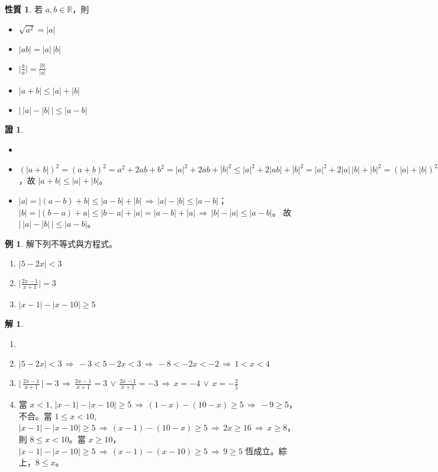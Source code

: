 \documentclass[12pt]{extarticle}
\newcommand{\ds}{\displaystyle}
\newcommand{\ie}{\,\Longrightarrow\,}
\theoremstyle{definition}
\newtheorem*{prp}{性質}
\newtheorem*{ex}{例}
\newtheorem*{sol}{解}
\newtheorem*{prf}{證}
\begin{document}
\begin{prp}
  若 $a, b\in\mathbb{R}$，則
  \begin{itemize}\setlength\itemsep{0em}
    \item $\ds \sqrt{a^2} = |a|$
    \item $\ds |a b| = |a|\,|b|$
    \item $\ds \Big|\frac{b}{a}\Big| = \frac{|b|}{|a|}$
    \item $\ds |a + b|\leqslant|a| + |b|$
    \item $\ds \big|\,|a| - |b|\,\big|\leqslant|a - b|$
  \end{itemize}
\end{prp}

\begin{prf}
  \begin{itemize}\setlength\itemsep{0em}
    \item[]
    \item $\ds (|a + b|)^2 = (a + b)^2 = a^2 + 2 a b + b^2 = |a|^2 + 2 a b + |b|^2 \leqslant |a|^2 + 2 |a b| + |b|^2 = |a|^2 + 2 |a|\,|b| + |b|^2 = (|a| + |b|)^2$，故 $\ds |a + b|\leqslant|a| + |b|$。
    \item $\ds |a| = |(a - b) + b| \leqslant |a - b| + |b| \ie |a| - |b| \leqslant |a - b|$； $\ds |b| = |(b - a) + a| \leqslant |b - a| + |a| = |a - b| + |a| \ie |b| - |a| \leqslant |a - b|$。 故 $\ds \big|\,|a| - |b|\,\big|\leqslant|a - b|$。
  \end{itemize}
\end{prf}

\begin{ex}
  解下列不等式與方程式。
  \begin{enumerate}\setlength\itemsep{0em}
    \item $\ds |5 - 2x| < 3$
    \item $\ds \Big|\frac{2 x - 1}{x + 1}\Big| = 3$
    \item $\ds |x - 1| - |x - 10|\geqslant 5$
  \end{enumerate}
\end{ex}

\begin{sol}
  \begin{enumerate}\setlength\itemsep{0em}
    \item[]
    \item $\ds |5 - 2x| < 3 \ie -3 < 5 - 2x < 3 \ie -8 < -2x < -2 \ie 1 < x < 4$
    \item $\ds \Big|\,\frac{2 x - 1}{x + 1}\,\Big| = 3 \ie \frac{2 x - 1}{x + 1} = 3\,\vee\,\frac{2 x - 1}{x + 1} = -3 \ie x = -4 \,\vee\, x = -\frac{2}{5}$
    \item 當 $x < 1$, $\ds |x - 1| - |x - 10|\geqslant 5 \ie (1 - x) - (10 - x)\geqslant 5 \ie -9 \geqslant 5$，不合。當 $1\leqslant x < 10$, $\ds |x - 1| - |x - 10|\geqslant 5 \ie (x - 1) - (10 - x)\geqslant 5 \ie 2 x\geqslant 16 \ie x\geqslant 8$，則 $8\leqslant x < 10$。當 $x\geqslant 10$，$\ds |x - 1| - |x - 10|\geqslant 5 \ie (x - 1) - (x - 10)\geqslant 5 \ie 9\geqslant 5$ 恆成立。綜上，$8\leqslant x$。
  \end{enumerate}
\end{sol}
\end{document}
